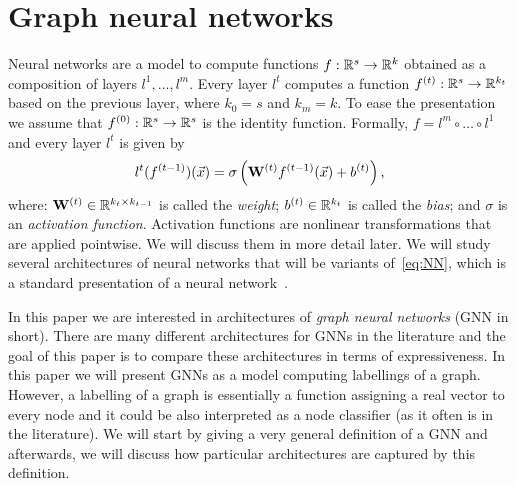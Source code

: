 

\section{Graph neural networks}
Neural networks are a model to compute functions $f : \mathbb{R}^s \to \mathbb{R}^k$ obtained as a composition of layers $l^1,\ldots, l^m$. Every layer $l^t$ computes a function $f^{(t)} : \mathbb{R}^{s} \to \mathbb{R}^{k_t}$ based on the previous layer, where $k_0 = s$ and $k_m =k$. To ease the presentation we assume that $f^{(0)} : \mathbb{R}^s \to \mathbb{R}^s$ is the identity function. Formally, $f = l^m \circ \ldots \circ l^1 $ and every layer $l^t$ is given by
\begin{equation}\label{eq:NN}
 l^t(f^{(t-1)}) (\vec{x}) = \sigma \left(\mathbf{W}^{(t)} f^{(t-1)}(\vec{x}) + b^{(t)}  \right),
\end{equation}
where: $\mathbf{W}^{(t)} \in \mathbb{R}^{k_{t} \times k_{t-1}}$ is called the \emph{weight}; $b^{(t)} \in \mathbb{R}^{k_t}$ is called the \emph{bias}; and $\sigma$ is an \emph{activation function}. Activation functions are nonlinear transformations that are applied pointwise. We will discuss them in more detail later. We will study several architectures of neural networks that will be variants of~\eqref{eq:NN}, which is a standard presentation of a neural network~\cite{?}.

In this paper we are interested in architectures of \emph{graph neural networks} (GNN in short). 
There are many different architectures for GNNs in the literature and the goal of this paper is to compare these architectures in terms of expressiveness. In this paper we will present GNNs as a model computing labellings of a graph. However, a labelling of a graph is essentially a function assigning a real vector to every node and it could be also interpreted as a node classifier (as it often is in the literature). We will start by giving a very general definition of a GNN and afterwards, we will discuss how particular architectures are captured by this definition.


